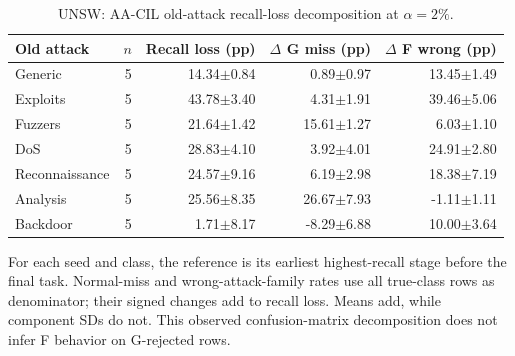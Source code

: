 \begin{table}[t]
\centering\scriptsize
\setlength{\tabcolsep}{3.3pt}
\caption{UNSW: AA-CIL old-attack recall-loss decomposition at $\alpha=2\%$.}\label{tab:forgetting-decomposition-unsw_nb15}
\begin{tabular}{lrrrr}
\toprule
Old attack & $n$ & Recall loss (pp) & $\Delta$ G miss (pp) & $\Delta$ F wrong (pp) \\
\midrule
Generic & 5 & 14.34$\pm$0.84 & 0.89$\pm$0.97 & 13.45$\pm$1.49 \\
Exploits & 5 & 43.78$\pm$3.40 & 4.31$\pm$1.91 & 39.46$\pm$5.06 \\
Fuzzers & 5 & 21.64$\pm$1.42 & 15.61$\pm$1.27 & 6.03$\pm$1.10 \\
DoS & 5 & 28.83$\pm$4.10 & 3.92$\pm$4.01 & 24.91$\pm$2.80 \\
Reconnaissance & 5 & 24.57$\pm$9.16 & 6.19$\pm$2.98 & 18.38$\pm$7.19 \\
Analysis & 5 & 25.56$\pm$8.35 & 26.67$\pm$7.93 & -1.11$\pm$1.11 \\
Backdoor & 5 & 1.71$\pm$8.17 & -8.29$\pm$6.88 & 10.00$\pm$3.64 \\
\bottomrule
\end{tabular}
\par\smallskip\begin{minipage}{0.98\textwidth}\scriptsize For each seed and class, the reference is its earliest highest-recall stage before the final task. Normal-miss and wrong-attack-family rates use all true-class rows as denominator; their signed changes add to recall loss. Means add, while component SDs do not. This observed confusion-matrix decomposition does not infer F behavior on G-rejected rows.\end{minipage}
\end{table}

